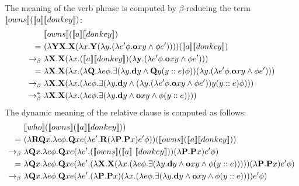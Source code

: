 \begin{example}
The meaning of the verb phrase  is computed by $\beta$-reducing the term $  [\![owns]\!]  ([\![a]\!] [\![donkey]\!] )  $:
\begin{align*}
& \trr{\I{owns}}  (\trr{\I{a}} \trr{\I{donkey}} ) \\
= \ & ( \lambda \Y2 \X2. \X2 ( \lambda \x1. \Y2 (\lambda \y1. ( \lambda e' \phi. \cown \x1 \y1 \land \phi e'))) ) (\trr{\I{a}} \trr{\I{donkey} } )  \\
\bconv \ &  \lambda  \X2. \X2 ( \lambda \x1. (\trr{\I{a}} \trr{\I{donkey} } )  (\lambda \y2. ( \lambda e' \phi. \cown \x1 \y1 \land \phi e')))  \\
= \ & \lambda  \X2. \X2 ( \lambda \x1. ( \lambda  \Q2. \lambda e \phi. \exists (\lambda \y1.  \cdonkey \y1  \land  \Q2 \y1  (\upii{\y1}{e}) \phi )  )  (\lambda \y1. ( \lambda e' \phi. \cown \x1 \y1 \land \phi e')))  \\
\bconv \ &   \lambda  \X2. \X2 ( \lambda \x1. ( \lambda e \phi. \exists (\lambda \y1.  \cdonkey \y1  \land  (\lambda \y1. ( \lambda e' \phi. \cown \x1 \y1 \land \phi e')) \y1  (\upii{\y1}{e}) \phi )  )  )  \\
\bred \ &    \lambda  \X2. \X2 ( \lambda \x1. ( \lambda e \phi. \exists (\lambda \y1.  \cdonkey \y1  \land  \cown \x1 \y1 \land \phi (\upii{\y1}{e}) )  )  )  
\end{align*}
The dynamic meaning of the relative clause  is computed as follows:
\begin{align}
& \trr{\I{who}}  (\trr{\I{owns}}  (\trr{\I{a}} \trr{\I{donkey}} )) \notag \\
= \ &  (\lambda \R2 \Q2 \x1. \lambda e \phi. \Q2 \x1 e (\lambda e'. \R2 (\lambda \P2. \P2 \x1) e' \phi)) (\trr{\I{owns}}  (\trr{\I{a}}  \trr{\I{donkey}} )) \notag \\
\bconv \ &  \lambda  \Q2 \x1. \lambda e \phi. \Q2 \x1 e (\lambda e'. (\trr{\I{owns}}  (\trr{\I{a}} \ \trr{\I{donkey}} ))  (\lambda \P2. \P2 \x1) e' \phi) \notag \\
= \ &   \lambda  \Q2 \x1. \lambda e \phi. \Q2 \x1 e (\lambda e'. (   \lambda  \X2. \X2 ( \lambda \x1. ( \lambda e \phi. \exists (\lambda \y1.  \cdonkey \y1  \land  \cown \x1 \y1 \land \phi (\upii{\y1}{e}) )  )  )  )  (\lambda \P2. \P2 \x1) e' \phi) \notag \\
\bconv \ &  \lambda  \Q2 \x1. \lambda e \phi. \Q2 \x1 e (\lambda e'.  (\lambda \P2. \P2 \x1) ( \lambda \x1. ( \lambda e \phi. \exists (\lambda \y1.  \cdonkey \y1  \land  \cown \x1 \y1 \land \phi (\upii{\y1}{e}) )  )  )    e' \phi) \notag \\

\end{align}
\end{example}
